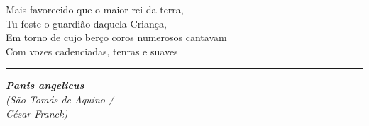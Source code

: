 \documentclass[a5paper,9pt]{memoir}
\begin{document}
{\begin{paracol}{2}
Mais favorecido que o maior rei da terra,\\
Tu foste o guardião daquela Criança,\\
Em torno de cujo berço coros numerosos cantavam\\
Com vozes cadenciadas, tenras e suaves\\
\end{paracol}
\vspace{-0.3cm}
%
%
%
%
%
%
%
%


\noindent 
{\color{mygray}\hrule}

\begin{paracol}{2}
\small
{}
\setlength{\parindent}{0em}
{\itshape
\textbf{Panis angelicus}\\
(São Tomás de Aquino / \\ César Franck)

}
\end{paracol}}
\end{document}
